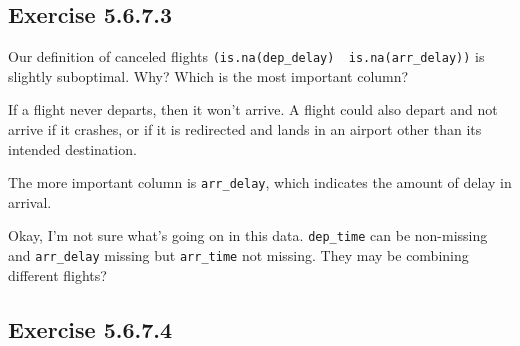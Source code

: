 \documentclass[]{book}
\newenvironment{Shaded}{\begin{snugshade}}{\end{snugshade}}
\newcommand{\CommentTok}[1]{\textcolor[rgb]{0.56,0.35,0.01}{\textit{#1}}}
\newcommand{\KeywordTok}[1]{\textcolor[rgb]{0.13,0.29,0.53}{\textbf{#1}}}
\newcommand{\NormalTok}[1]{#1}
\newcommand{\OperatorTok}[1]{\textcolor[rgb]{0.81,0.36,0.00}{\textbf{#1}}}
\newcommand{\StringTok}[1]{\textcolor[rgb]{0.31,0.60,0.02}{#1}}
\theoremstyle{plain}
\theoremstyle{remark}
\begin{document}
\hypertarget{exercise-5.6.7.3}{%
\subsection*{\texorpdfstring{Exercise {5.6.7.3}}{Exercise 5.6.7.3}}\label{exercise-5.6.7.3}}

Our definition of canceled flights \texttt{(is.na(dep\_delay)\ \textbar{}\ is.na(arr\_delay))} is slightly suboptimal. Why? Which is the most important column?

If a flight never departs, then it won't arrive.
A flight could also depart and not arrive if it crashes, or if it is redirected and lands in an airport other than its intended destination.

The more important column is \texttt{arr\_delay}, which indicates the amount of delay in arrival.

\begin{Shaded}
\end{Shaded}

Okay, I'm not sure what's going on in this data. \texttt{dep\_time} can be non-missing and \texttt{arr\_delay} missing but \texttt{arr\_time} not missing.
They may be combining different flights?

\hypertarget{exercise-5.6.7.4}{%
\subsection*{\texorpdfstring{Exercise {5.6.7.4}}{Exercise 5.6.7.4}}\label{exercise-5.6.7.4}}
\end{document}
